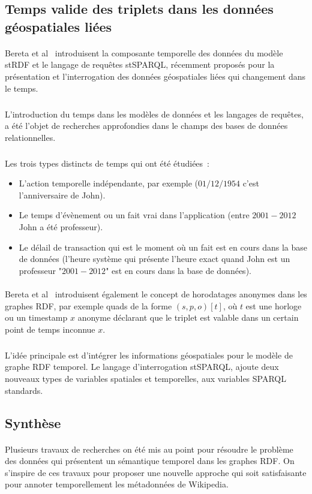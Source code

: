 \subsection*{Temps valide des triplets dans les données géospatiales liées}
\paragraph{}
Bereta et al~\cite{bereta2013} introduisent la composante temporelle des données du modèle stRDF et le langage de requêtes stSPARQL, récemment proposés pour la présentation et l’interrogation des données géospatiales liées qui changement dans le temps.
\subparagraph{}
L’introduction du temps dans les modèles de données et les langages de requêtes, a été l’objet de recherches approfondies dans le champs des bases de données relationnelles.
\subparagraph{}
Les trois types distincts de temps qui ont été  étudiées~:
\begin{itemize}
\item L'action temporelle indépendante, par exemple ($01/12/1954$ c’est l’anniversaire de John).
\item Le temps d’évènement ou un fait vrai dans l’application (entre $2001-2012$ John a été professeur).
\item Le délail de transaction qui est le moment où un fait est en cours dans la base de données (l’heure système qui présente l’heure exact quand John est un professeur "$2001-2012$" est en cours dans la base de données).
\end{itemize}
\paragraph{}
Bereta et al~\cite{bereta2013} introduisent également le concept de horodatages anonymes dans les graphes RDF, par exemple quads de la forme $(s, p, o)[t]$, où $t$ est une horloge ou un timestamp $x$ anonyme déclarant que le triplet est valable dans un certain point de temps inconnue $x$.
\subparagraph{}
L’idée principale est d’intégrer les informations géospatiales pour le modèle de graphe RDF temporel. Le langage d’interrogation stSPARQL, ajoute deux nouveaux types de variables spatiales et temporelles, aux variables SPARQL standards.
\subsection*{Synthèse}
\paragraph{}
Plusieurs travaux de recherches on été mis au point pour résoudre le problème des données qui présentent un sémantique temporel dans les graphes RDF. On s'inspire de ces travaux pour proposer une nouvelle approche qui soit satisfaisante pour annoter temporellement les métadonnées de Wikipedia.
